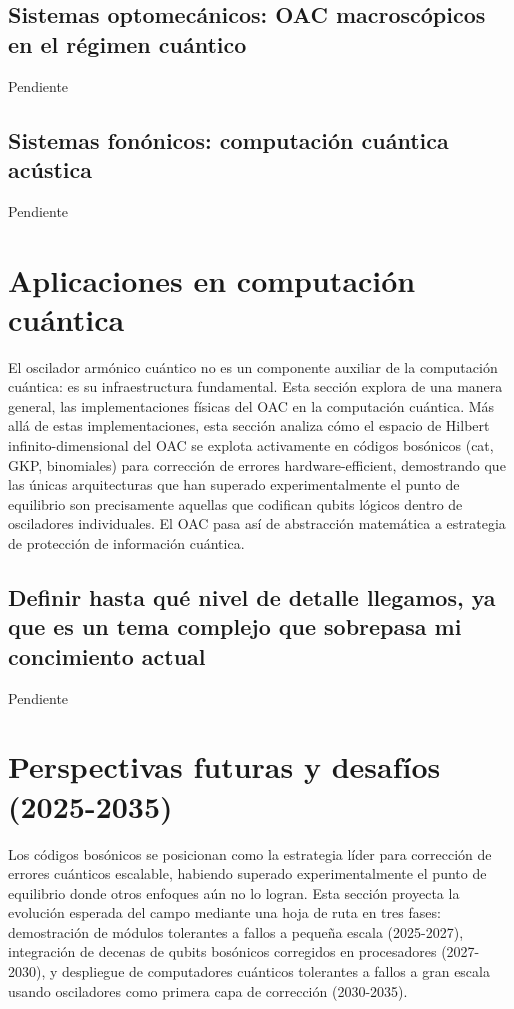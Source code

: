 \documentclass[11pt,a4paper,spanish]{book}
\begin{document}
\subsection*{Sistemas optomecánicos: OAC macroscópicos en el régimen cuántico}
Pendiente

\subsection*{Sistemas fonónicos: computación cuántica acústica}
Pendiente


\section{Aplicaciones en computación cuántica}

El oscilador armónico cuántico no es un componente auxiliar de la computación cuántica: es su infraestructura fundamental. Esta sección explora de una manera general, las implementaciones físicas del OAC en la computación cuántica. Más allá de estas implementaciones, esta sección analiza cómo el espacio de Hilbert infinito-dimensional del OAC se explota activamente en códigos bosónicos (cat, GKP, binomiales) para corrección de errores hardware-efficient, demostrando que las únicas arquitecturas que han superado experimentalmente el punto de equilibrio son precisamente aquellas que codifican qubits lógicos dentro de osciladores individuales. El OAC pasa así de abstracción matemática a estrategia de protección de información cuántica.


\subsection*{Definir hasta qué nivel de detalle llegamos, ya que es un tema complejo que sobrepasa mi concimiento actual}
Pendiente

\section{Perspectivas futuras y desafíos (2025-2035)}
Los códigos bosónicos se posicionan como la estrategia líder para corrección de errores cuánticos escalable, habiendo superado experimentalmente el punto de equilibrio donde otros enfoques aún no lo logran. Esta sección proyecta la evolución esperada del campo mediante una hoja de ruta en tres fases: demostración de módulos tolerantes a fallos a pequeña escala (2025-2027), integración de decenas de qubits bosónicos corregidos en procesadores (2027-2030), y despliegue de computadores cuánticos tolerantes a fallos a gran escala usando osciladores como primera capa de corrección (2030-2035). 
\end{document}
